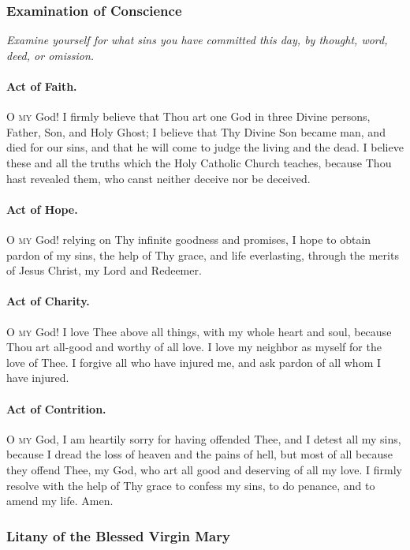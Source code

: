 \documentclass{article}
\begin{document}
\begin{multicols}{3}
\subsubsection*{Examination of Conscience}

\textit{Examine yourself for what sins you have committed this day, by thought, word, deed, or omission.}

\paragraph{Act of Faith.}
\textsc{O my} God! I firmly believe that Thou art one God in three Divine persons,
Father, Son, and Holy Ghost; I believe that Thy Divine Son became man,
and died for our sins, and that he will come to judge the living and the
dead. I believe these and all the truths which the Holy Catholic Church
teaches, because Thou hast revealed them, who canst neither deceive nor
be deceived.

\paragraph{Act of Hope.}
\textsc{O my} God! relying on Thy infinite goodness and promises, I hope to obtain
pardon of my sins, the help of Thy grace, and life everlasting, through
the merits of Jesus Christ, my Lord and Redeemer. 

\paragraph{Act of Charity.}
\textsc{O my} God! I love Thee above all things, with my whole heart and soul,
because Thou art all-good and worthy of all love. I love my neighbor as
myself for the love of Thee. I forgive all who have injured me, and ask
pardon of all whom I have injured. 

\paragraph{Act of Contrition.}
\textsc{O my} God, I am heartily sorry for having offended Thee, and I detest all my sins, because I dread
the loss of heaven and the pains of hell, but most of all because they offend Thee, my God, who art all good and deserving of all my love. I firmly resolve with the help of Thy grace to confess my sins, to do penance,
and to amend my life.  Amen.

\begin{FlushLeft}
\subsubsection*{Litany of the Blessed Virgin Mary}


\end{FlushLeft}
\end{multicols}
\end{document}
